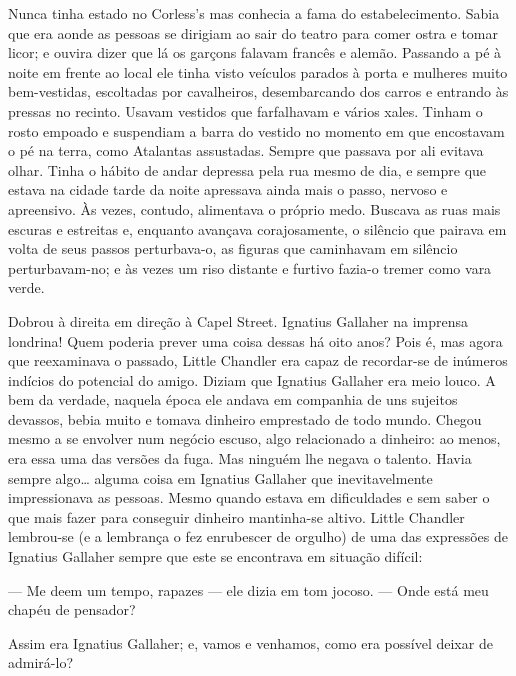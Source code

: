 Nunca tinha estado no Corless’s mas conhecia a fama do estabelecimento.  Sabia
que era aonde as pessoas se dirigiam ao sair do teatro para comer ostra e tomar
licor; e ouvira dizer que lá os garçons falavam francês e alemão.  Passando a
pé à noite em frente ao local ele tinha visto veículos parados à porta e
mulheres muito bem-vestidas, escoltadas por cavalheiros, desembarcando dos
carros e entrando às pressas no recinto.  Usavam vestidos que farfalhavam e
vários xales.  Tinham o rosto empoado e suspendiam a barra do vestido no
momento em que encostavam o pé na terra, como Atalantas assustadas.  Sempre que
passava por ali evitava olhar.  Tinha o hábito de andar depressa pela rua mesmo
de dia, e sempre que estava na cidade tarde da noite apressava ainda mais o
passo, nervoso e apreensivo.  Às vezes, contudo, alimentava o próprio medo.
Buscava as ruas mais escuras e estreitas e, enquanto avançava corajosamente, o
silêncio que pairava em volta de seus passos perturbava-o, as figuras que
caminhavam em silêncio perturbavam-no; e às vezes um riso distante e furtivo
fazia-o tremer como vara verde.

Dobrou à direita em direção à Capel Street.  Ignatius Gallaher na imprensa
londrina!  Quem poderia prever uma coisa dessas há oito anos?  Pois é, mas
agora que reexaminava o passado, Little Chandler era capaz de recordar-se de
inúmeros indícios do potencial do amigo.  Diziam que Ignatius Gallaher era meio
louco.  A bem da verdade, naquela época ele andava em companhia de uns sujeitos
devassos, bebia muito e tomava dinheiro emprestado de todo mundo.  Chegou mesmo
a se envolver num negócio escuso, algo relacionado a dinheiro: ao menos, era
essa uma das versões da fuga.  Mas ninguém lhe negava o talento.  Havia sempre
algo\ldots{} alguma coisa em Ignatius Gallaher que inevitavelmente
impressionava as pessoas.  Mesmo quando estava em dificuldades e sem saber o
que mais fazer para conseguir dinheiro mantinha-se altivo.  Little Chandler
lembrou-se (e a lembrança o fez enrubescer de orgulho) de uma das expressões de
Ignatius Gallaher sempre que este se encontrava em situação difícil:

--- Me deem um tempo, rapazes --- ele dizia em tom jocoso.  --- Onde está meu
chapéu de pensador?

Assim era Ignatius Gallaher; e, vamos e venhamos, como era possível deixar de
admirá-lo?

